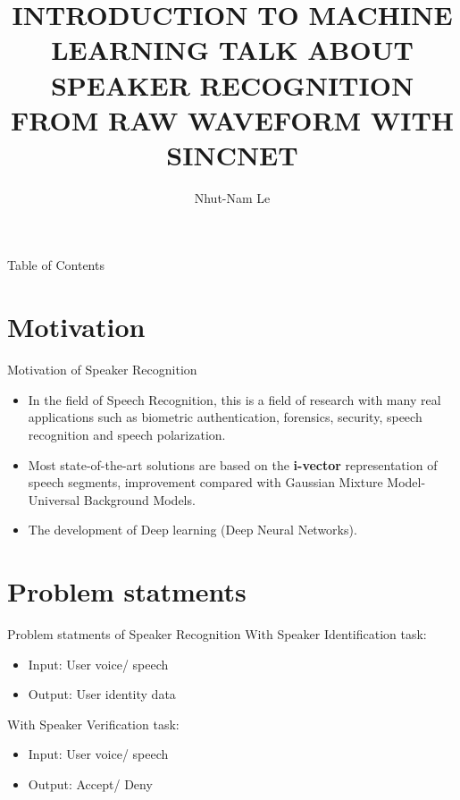 \documentclass[11pt]{beamer}
\author{Nhut-Nam Le}
\title{INTRODUCTION TO MACHINE LEARNING \newline TALK ABOUT SPEAKER RECOGNITION FROM \newline RAW WAVEFORM WITH SINCNET}
\institute{Department of Computer Science, University of Science, VNU}
\date[\today]{}
\begin{document}
\begin{frame}
	\titlepage
\end{frame}

\begin{frame}{Table of Contents}
	\tableofcontents
\end{frame}

\section{Motivation}
\begin{frame}{Motivation of Speaker Recognition}
	\begin{itemize}
		\item In the field of Speech Recognition, this is a field of research with many real applications such as biometric authentication, forensics, security, speech recognition and speech polarization.
		\item Most state-of-the-art solutions are based on the \textbf{i-vector} representation of speech segments, improvement compared with Gaussian Mixture Model-Universal Background Models.
		\item The development of Deep learning (Deep Neural Networks).
	\end{itemize}
\end{frame}
\section{Problem statments}
\begin{frame}{Problem statments of Speaker Recognition}
	With Speaker Identification task:
	\begin{itemize}
		\item Input: User voice/ speech
		\item Output: User identity data
	\end{itemize}
	With Speaker Verification task:
	\begin{itemize}
		\item Input: User voice/ speech
		\item Output: Accept/ Deny
	\end{itemize}
\end{frame}
\end{document}
